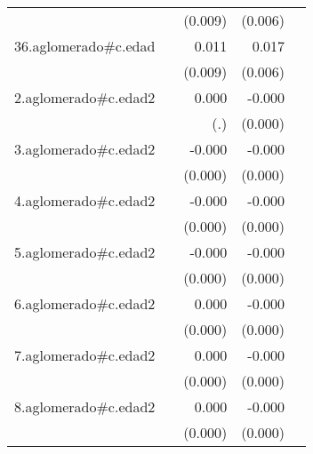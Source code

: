 {\begin{longtable}{l*{4}{D{.}{.}{-1}}}
            &                     &     (0.009)         &     (0.006)         &                     \\
\addlinespace
36.aglomerado#c.edad&                     &       0.011         &       0.017\sym{**} &                     \\
            &                     &     (0.009)         &     (0.006)         &                     \\
\addlinespace
2.aglomerado#c.edad2&                     &       0.000         &      -0.000         &                     \\
            &                     &         (.)         &     (0.000)         &                     \\
\addlinespace
3.aglomerado#c.edad2&                     &      -0.000         &      -0.000\sym{***}&                     \\
            &                     &     (0.000)         &     (0.000)         &                     \\
\addlinespace
4.aglomerado#c.edad2&                     &      -0.000         &      -0.000\sym{***}&                     \\
            &                     &     (0.000)         &     (0.000)         &                     \\
\addlinespace
5.aglomerado#c.edad2&                     &      -0.000         &      -0.000         &                     \\
            &                     &     (0.000)         &     (0.000)         &                     \\
\addlinespace
6.aglomerado#c.edad2&                     &       0.000         &      -0.000         &                     \\
            &                     &     (0.000)         &     (0.000)         &                     \\
\addlinespace
7.aglomerado#c.edad2&                     &       0.000         &      -0.000         &                     \\
            &                     &     (0.000)         &     (0.000)         &                     \\
\addlinespace
8.aglomerado#c.edad2&                     &       0.000         &      -0.000         &                     \\
            &                     &     (0.000)         &     (0.000)         &                     \\

\end{longtable}}
